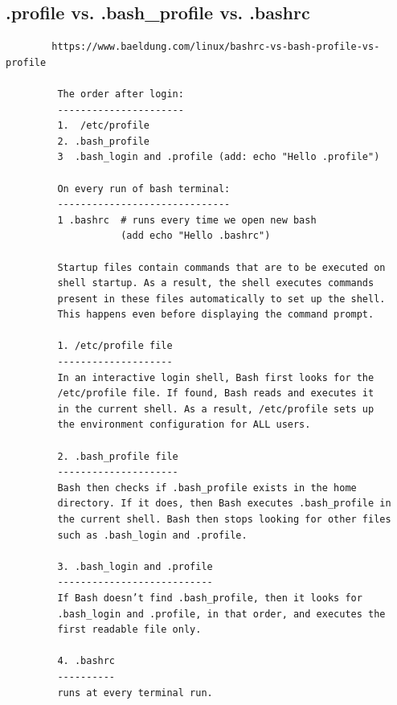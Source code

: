 \documentclass[a4paper,12pt]{article}
\begin{document}
\subsection{.profile vs. .bash\_profile vs. .bashrc}
\begin{verbatim}
        https://www.baeldung.com/linux/bashrc-vs-bash-profile-vs-profile
         
         The order after login:
         ----------------------
         1.  /etc/profile 
         2. .bash_profile 
         3  .bash_login and .profile (add: echo "Hello .profile")
         
         On every run of bash terminal:
         ------------------------------ 
         1 .bashrc  # runs every time we open new bash
                    (add echo "Hello .bashrc")
         
         Startup files contain commands that are to be executed on 
         shell startup. As a result, the shell executes commands 
         present in these files automatically to set up the shell. 
         This happens even before displaying the command prompt.
         
         1. /etc/profile file
         --------------------
         In an interactive login shell, Bash first looks for the 
         /etc/profile file. If found, Bash reads and executes it
         in the current shell. As a result, /etc/profile sets up
         the environment configuration for ALL users.
              
         2. .bash_profile file
         ---------------------
         Bash then checks if .bash_profile exists in the home 
         directory. If it does, then Bash executes .bash_profile in 
         the current shell. Bash then stops looking for other files 
         such as .bash_login and .profile.
         
         3. .bash_login and .profile
         ---------------------------
         If Bash doesn’t find .bash_profile, then it looks for 
         .bash_login and .profile, in that order, and executes the 
         first readable file only.
         
         4. .bashrc
         ----------
         runs at every terminal run.
         
\end{verbatim}
\end{document}
